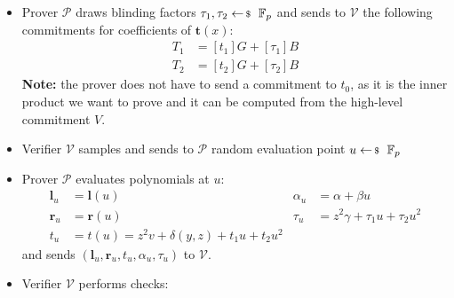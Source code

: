 \documentclass[../lecture-notes-148x210.tex]{subfiles}
\begin{document}
\begin{definition}
\begin{itemize}
\begin{equation*}
\begin{aligned}
                    t_0 &= \langle \mathbf{a}_L - z \cdot \mathbf{1}^n, z^2 \cdot \mathbf{2}^n + z \cdot \mathbf{y}^n + \mathbf{a}_R \circ \mathbf{y}^n\rangle = z^2v + \delta(y,z)\\
                    t_1 &= \langle \mathbf{a}_L - z \cdot \mathbf{1}^n, \mathbf{y}^n \circ \mathbf{s}_R \rangle + \langle \mathbf{y}^n \circ (\mathbf{a}_R + z\cdot \mathbf{1}^n ) + z^2 \cdot \mathbf{2}^n, \mathbf{s}_L\rangle \\
                    t_2 & = \langle \mathbf{s}_L, \mathbf{y}^n \circ \mathbf{s}_R \rangle
                \end{aligned}
            \end{equation*}
        \item Prover $\mathcal{P}$ draws blinding factors $\tau_1, \tau_2 \leftarrowS \mathbb{F}_p$ and sends to $\mathcal{V}$ the following commitments for coefficients of $\mathbf{t}(x)$:
            \begin{equation}
                \begin{aligned}
                    T_1 &= [t_1]G + [\tau_1]B \\
                    T_2 &= [t_2]G + [\tau_2]B
                \end{aligned}
            \end{equation}
            \textbf{Note:} the prover does not have to send a commitment to $t_0$, as it is the inner product we want to prove and it can be computed from the high-level commitment $V$.
        \item Verifier $\mathcal{V}$ samples and sends to $\mathcal{P}$ random evaluation point $u \leftarrowS \mathbb{F}_p$
        \item Prover $\mathcal{P}$ evaluates polynomials at $u$:
            \begin{equation}
                \begin{aligned}
                    \mathbf{l}_u & = \mathbf{l}(u) & \alpha_u &= \alpha + \beta u\\
                    \mathbf{r}_u &= \mathbf{r}(u) & \tau_u &= z^2\gamma + \tau_1 u + \tau_2 u^2\\
                    t_u &= t(u) = z^2v + \delta(y,z) + t_1u + t_2u^2 & 
                \end{aligned}
            \end{equation}
            and sends $(\mathbf{l}_u, \mathbf{r}_u, t_u, \alpha_u, \tau_u)$ to $\mathcal{V}$.
        \item Verifier $\mathcal{V}$ performs checks: 

\end{itemize}
\end{definition}
\end{document}
